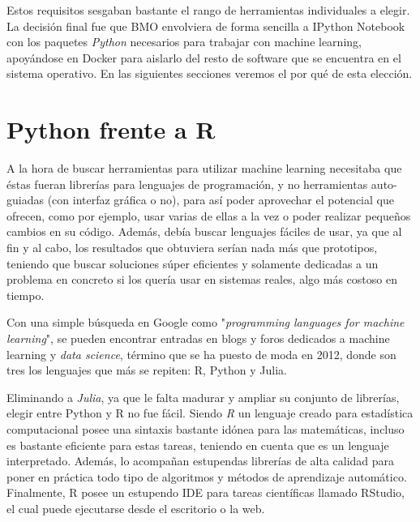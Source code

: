 Estos requisitos sesgaban bastante el rango de herramientas individuales a elegir. La decisión final fue que BMO envolviera de forma sencilla a {IPython Notebook} con los paquetes \emph{Python} necesarios para trabajar con machine learning, apoyándose en Docker para aislarlo del resto de software que se encuentra en el sistema operativo. En las siguientes secciones veremos el por qué de esta elección.

\section{Python frente a R} \label{sec:4.2}

A la hora de buscar herramientas para utilizar machine learning necesitaba que éstas fueran librerías para lenguajes de programación, y no herramientas auto-guiadas (con interfaz gráfica o no), para así poder aprovechar el potencial que ofrecen, como por ejemplo, usar varias de ellas a la vez o poder realizar pequeños cambios en su código. Además, debía buscar lenguajes fáciles de usar, ya que al fin y al cabo, los resultados que obtuviera serían nada más que prototipos, teniendo que buscar soluciones súper eficientes y solamente dedicadas a un problema en concreto si los quería usar en sistemas reales, algo más costoso en tiempo.

Con una simple búsqueda en Google como "\emph{programming languages for machine learning}", se pueden encontrar entradas en blogs y foros dedicados a machine learning y \emph{data science}, término que se ha puesto de moda en 2012, donde son tres los lenguajes que más se repiten: R, Python y Julia.

Eliminando a \emph{Julia}, ya que le falta madurar y ampliar su conjunto de librerías, elegir entre Python y R no fue fácil. Siendo \emph{R} un lenguaje creado para estadística computacional posee una sintaxis bastante idónea para las matemáticas, incluso es bastante eficiente para estas tareas, teniendo en cuenta que es un lenguaje interpretado. Además, lo acompañan estupendas librerías de alta calidad para poner en práctica todo tipo de algoritmos y métodos de aprendizaje automático. Finalmente, R posee un estupendo IDE para tareas científicas llamado RStudio, el cual puede ejecutarse desde el escritorio o la web.

